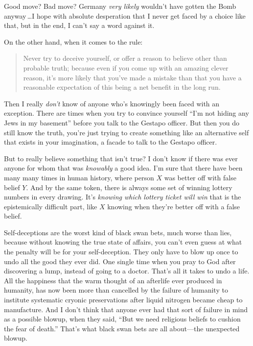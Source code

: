  Good move? Bad move? Germany \textit{very likely}
wouldn't have gotten the Bomb anyway\,\ldots I hope with
absolute desperation that I never get faced by a choice like that, but
in the end, I can't say a word against it.


 On the other hand, when it comes to the rule:

\begin{quote}
{
 Never try to deceive yourself, or offer a reason to believe other
than probable truth; because even if you come up with an amazing clever
reason, it's more likely that you've
made a mistake than that you have a reasonable expectation of this
being a net benefit in the long run.}
\end{quote}


 Then I really \textit{don't} know of anyone
who's knowingly been faced with an exception. There are
times when you try to convince yourself
``I'm not hiding any Jews in my
basement'' before you talk to the Gestapo officer.
But then you do still know the truth, you're just
trying to create something like an alternative self that exists in your
imagination, a facade to talk to the Gestapo officer.


 But to really believe something that isn't true? I
don't know if there was ever anyone for whom that was
\textit{knowably} a good idea. I'm sure that there have
been many many times in human history, where person $X$ was better off
with false belief $Y$. And by the same token, there is always some set of
winning lottery numbers in every drawing. It's
\textit{knowing which lottery ticket will win} that is the
epistemically difficult part, like $X$ knowing when
they're better off with a false belief.


 Self-deceptions are the worst kind of black swan bets, much worse
than lies, because without knowing the true state of affairs, you
can't even guess at what the penalty will be for your
self-deception. They only have to blow up once to undo all the good
they ever did. One single time when you pray to God after discovering a
lump, instead of going to a doctor. That's all it takes
to undo a life. All the happiness that the warm thought of an afterlife
ever produced in humanity, has now been more than cancelled by the
failure of humanity to institute systematic cryonic preservations after
liquid nitrogen became cheap to manufacture. And I
don't think that anyone ever had that sort of failure
in mind as a possible blowup, when they said, ``But we
need religious beliefs to cushion the fear of
death.'' That's what black swan bets
are all about---the unexpected blowup.


